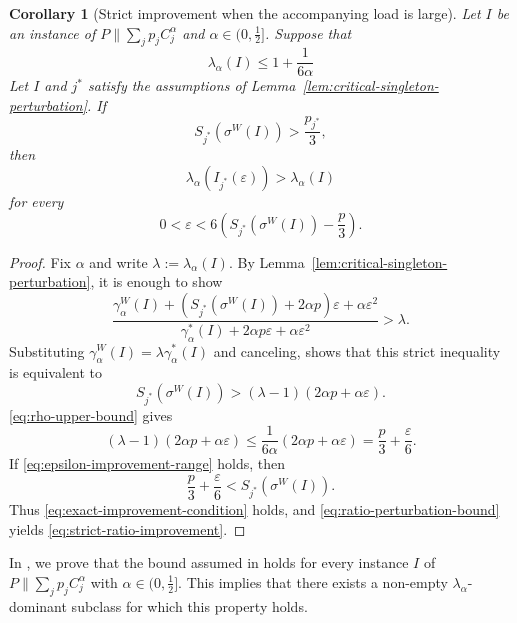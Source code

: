 \documentclass[%
english, titlepage=false %
]{./tum-templates/book/tumbook}
\newtheorem{corollary}{Corollary}
\newcommand{\Problem}{P\!\parallel\!\sum_j p_j C^{\alpha}_j}
\newcommand{\LamI}{\lambda_{\alpha}(I)}
\newcommand{\OptCost}{\gamma_{\alpha}^{*}(I)}
\newcommand{\WorstCost}{\gamma_{\alpha}^{W}(I)}
\begin{document}
\begin{corollary}[Strict improvement when the accompanying load is large]
\label{thm:strict-perturbation-improvement}
Let $I$ be an instance of $\Problem$ and $\alpha\in\Big(0,\tfrac12\Big]$. Suppose that
\begin{equation}
    \LamI\leq 1+\frac{1}{6\alpha}
    \label{eq:rho-upper-bound}
\end{equation}
Let $I$ and $j^*$ satisfy the
assumptions of
Lemma~\ref{lem:critical-singleton-perturbation}. 
If
\[
    S_{j^*}(\sigma^{W}(I))>\frac{p_{j^*}}{3},
\]
then
\begin{equation}
    \boxed{\lambda_{\alpha}(I_{j^*}(\varepsilon))>\LamI}
    \label{eq:strict-ratio-improvement}
\end{equation}
for every
\begin{equation}
    0<\varepsilon<
    6\left(S_{j^*}(\sigma^{W}(I))-\frac p3\right).
    \label{eq:epsilon-improvement-range}
\end{equation}
\end{corollary}

\begin{proof}
Fix $\alpha$ and write $\lambda:=\LamI$.  By
Lemma~\ref{lem:critical-singleton-perturbation}, it is enough to show
\[
    \frac{
        \WorstCost+(S_{j^*}(\sigma^{W}(I))+2\alpha p)\varepsilon
        +\alpha\varepsilon^2
    }{
        \OptCost+2\alpha p\varepsilon
        +\alpha\varepsilon^2
    }
    >\lambda.
\]
Substituting $\WorstCost=\lambda\OptCost$ and canceling,
shows that this strict inequality is equivalent to
\begin{equation}
    S_{j^*}(\sigma^{W}(I))>
    (\lambda-1)(2\alpha p+\alpha\varepsilon).
    \label{eq:exact-improvement-condition}
\end{equation}
\eqref{eq:rho-upper-bound} gives
\[
    (\lambda-1)(2\alpha p+\alpha\varepsilon)
    \leq
    \frac{1}{6\alpha}
    (2\alpha p+\alpha\varepsilon)
    =
    \frac p3+\frac{\varepsilon}{6}.
\]
If \eqref{eq:epsilon-improvement-range} holds, then
\[
    \frac p3+\frac{\varepsilon}{6}<S_{j^*}(\sigma^{W}(I)).
\]
Thus \eqref{eq:exact-improvement-condition} holds, and
\eqref{eq:ratio-perturbation-bound} yields
\eqref{eq:strict-ratio-improvement}.
\end{proof}

In , we prove that the bound assumed in
 holds for every instance
\(I\) of \(\Problem\) with \(\alpha\in\Big(0,\frac12\Big]\). This implies 
that there exists a non-empty $\lambda_{\alpha}$-dominant subclass for which this property holds.\medskip
\end{document}
